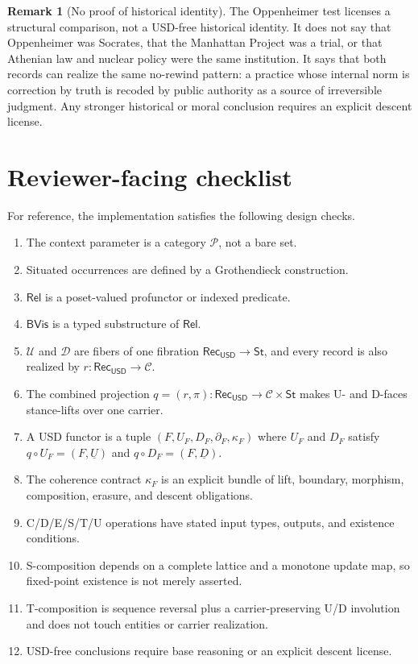\documentclass[11pt]{article}
\newcommand{\USD}{\mathsf{USD}}
\newcommand{\RecUSD}{\mathsf{Rec}_{\USD}}
\newcommand{\St}{\mathsf{St}}
\newcommand{\UFib}{\mathcal U}
\newcommand{\DFib}{\mathcal D}
\newcommand{\Rel}{\mathsf{Rel}}
\newcommand{\BVis}{\mathsf{BVis}}
\theoremstyle{definition}
\newtheorem{remark}[definition]{Remark}
\theoremstyle{plain}
\begin{document}
\begin{remark}[No proof of historical identity]
The Oppenheimer test licenses a structural comparison, not a USD-free
historical identity.  It does not say that Oppenheimer was Socrates, that
the Manhattan Project was a trial, or that Athenian law and nuclear
policy were the same institution.  It says that both records can realize
the same no-rewind pattern: a practice whose internal norm is correction
by truth is recoded by public authority as a source of irreversible
judgment.  Any stronger historical or moral conclusion requires an
explicit descent license.
\end{remark}

\section{Reviewer-facing checklist}

For reference, the implementation satisfies the following design checks.

\begin{enumerate}[leftmargin=*]
  \item The context parameter is a category $\mathcal P$, not a bare set.
  \item Situated occurrences are defined by a Grothendieck construction.
  \item $\Rel$ is a poset-valued profunctor or indexed predicate.
  \item $\BVis$ is a typed substructure of $\Rel$.
  \item $\UFib$ and $\DFib$ are fibers of one fibration
  $\RecUSD\to\St$, and every record is also realized by
  $r:\RecUSD\to\mathcal C$.
  \item The combined projection $q=(r,\pi):\RecUSD\to\mathcal C\times\St$
  makes U- and D-faces stance-lifts over one carrier.
  \item A USD functor is a tuple
  $(F,U_F,D_F,\partial_F,\kappa_F)$ where $U_F$ and $D_F$ satisfy
  $q\circ U_F=(F,\underline U)$ and $q\circ D_F=(F,\underline D)$.
  \item The coherence contract $\kappa_F$ is an explicit bundle of lift,
  boundary, morphism, composition, erasure, and descent obligations.
  \item C/D/E/S/T/U operations have stated input types, outputs, and
  existence conditions.
  \item S-composition depends on a complete lattice and a monotone update
  map, so fixed-point existence is not merely asserted.
  \item T-composition is sequence reversal plus a carrier-preserving U/D
  involution and does not touch entities or carrier realization.
  \item USD-free conclusions require base reasoning or an explicit
  descent license.
\end{enumerate}
\end{document}
